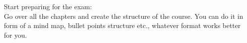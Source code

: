 \begin{solution}
\end{solution}

\begin{exercise}

Start preparing for the exam: \\
Go over all the chapters and create the structure of the course.
You can do it in form of a mind map, bullet points structure etc., whatever format works better for you.

\end{exercise}


\begin{solution}

\end{solution}


